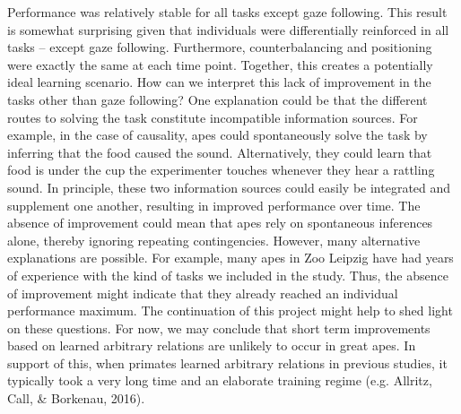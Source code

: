 \documentclass[10pt, letterpaper]{article}
\begin{document}
Performance was relatively stable for all tasks except gaze following.
This result is somewhat surprising given that individuals were
differentially reinforced in all tasks -- except gaze following.
Furthermore, counterbalancing and positioning were exactly the same at
each time point. Together, this creates a potentially ideal learning
scenario. How can we interpret this lack of improvement in the tasks
other than gaze following? One explanation could be that the different
routes to solving the task constitute incompatible information sources.
For example, in the case of causality, apes could spontaneously solve
the task by inferring that the food caused the sound. Alternatively,
they could learn that food is under the cup the experimenter touches
whenever they hear a rattling sound. In principle, these two information
sources could easily be integrated and supplement one another, resulting
in improved performance over time. The absence of improvement could mean
that apes rely on spontaneous inferences alone, thereby ignoring
repeating contingencies. However, many alternative explanations are
possible. For example, many apes in Zoo Leipzig have had years of
experience with the kind of tasks we included in the study. Thus, the
absence of improvement might indicate that they already reached an
individual performance maximum. The continuation of this project might
help to shed light on these questions. For now, we may conclude that
short term improvements based on learned arbitrary relations are
unlikely to occur in great apes. In support of this, when primates
learned arbitrary relations in previous studies, it typically took a
very long time and an elaborate training regime (e.g. Allritz, Call, \&
Borkenau, 2016).
\end{document}
